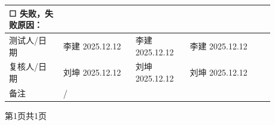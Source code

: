 \documentclass[UTF8,10pt,a4paper,fontset=fandol]{ctexart}
\newcommand{\fieldvalue}[1]{#1}
\newcommand{\handwritten}[1]{#1}
\newcommand{\checkboxfield}[1]{\ifstrequal{#1}{checked}{☑}{\ifstrequal{#1}{unclear}{?}{☐}}}
\begin{document}
\begin{tabular}{|p{0.18\linewidth}|p{0.24\linewidth}|p{0.18\linewidth}|p{0.28\linewidth}|}
\fieldvalue{\checkboxfield{unchecked}} 失败，失败原因： \\
\hline
测试人/日期 &
\fieldvalue{\handwritten{李建}}\quad
\fieldvalue{\handwritten{2025.12.12}} &
\fieldvalue{\handwritten{李建}}\quad
\fieldvalue{\handwritten{2025.12.12}} &
\fieldvalue{\handwritten{李建}}\quad
\fieldvalue{\handwritten{2025.12.12}} \\
\hline
复核人/日期 &
\fieldvalue{\handwritten{刘坤}}\quad
\fieldvalue{\handwritten{2025.12.12}} &
\fieldvalue{\handwritten{刘坤}}\quad
\fieldvalue{\handwritten{2025.12.12}} &
\fieldvalue{\handwritten{刘坤}}\quad
\fieldvalue{\handwritten{2025.12.12}} \\
\hline
备注 &
\fieldvalue{\handwritten{/}} &
\multicolumn{2}{l|}{} \\
\hline
\end{tabular}

\bigskip
\begin{center}
第1页共1页
\end{center}
\end{document}
